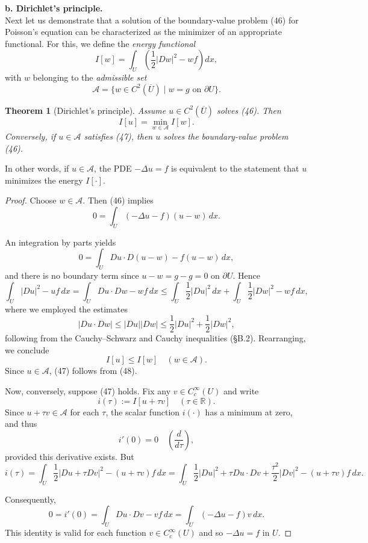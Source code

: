 \documentclass[a4paper,12pt]{report}
\newtheorem{theorem}{Theorem}[section]
\begin{document}
\noindent
\textbf{b. Dirichlet's principle.}\\

Next let us demonstrate that a solution of the boundary-value problem (46) for Poisson's equation can be characterized as the minimizer of an appropriate functional. For this, we define the \emph{energy functional}
\[
I[w] = \int_U \left( \frac{1}{2} |Dw|^2 - w f \right) dx,
\]
with \( w \) belonging to the \emph{admissible set}
\[
\mathcal{A} = \{ w \in C^2(\overline{U}) \mid w = g \text{ on } \partial U \}.
\]
\begin{theorem}[Dirichlet's principle]
Assume \( u \in C^2(\overline{U}) \) solves (46). Then
\[
I[u] = \min_{w \in \mathcal{A}} I[w].
\tag{47}
\]
Conversely, if \( u \in \mathcal{A} \) satisfies (47), then \( u \) solves the boundary-value problem (46).
\end{theorem}
In other words, if \( u \in \mathcal{A} \), the PDE \( -\Delta u = f \) is equivalent to the statement that \( u \) minimizes the energy \( I[\cdot] \).
\begin{proof}
Choose \( w \in \mathcal{A} \). Then (46) implies
\[
0 = \int_U (-\Delta u - f)(u - w) \, dx.
\]

An integration by parts yields
\[
0 = \int_U Du \cdot D(u - w) - f(u - w) \, dx,
\]
and there is no boundary term since \( u - w = g - g = 0 \) on \( \partial U \). Hence
\[
\int_U |Du|^2 - uf \, dx = \int_U Du \cdot Dw - wf \, dx \leq \int_U \frac{1}{2} |Du|^2 \, dx + \int_U \frac{1}{2} |Dw|^2 - wf \, dx,
\]
where we employed the estimates
\[
|Du \cdot Dw| \leq |Du||Dw| \leq \frac{1}{2}|Du|^2 + \frac{1}{2}|Dw|^2,
\]
following from the Cauchy–Schwarz and Cauchy inequalities (\S B.2). Rearranging, we conclude
\[
I[u] \leq I[w] \quad (w \in \mathcal{A}).
\]
Since \( u \in \mathcal{A} \), (47) follows from (48).

Now, conversely, suppose (47) holds. Fix any \( v \in C_c^\infty(U) \) and write
\[
i(\tau) := I[u + \tau v] \quad (\tau \in \mathbb{R}).
\]
Since \( u + \tau v \in \mathcal{A} \) for each \( \tau \), the scalar function \( i(\cdot) \) has a minimum at zero, and thus
\[
i'(0) = 0 \quad \left(\frac{d}{d\tau}\right),
\]
provided this derivative exists. But
\[
i(\tau) = \int_U \frac{1}{2}|Du + \tau Dv|^2 - (u + \tau v)f \, dx = \int_U \frac{1}{2}|Du|^2 + \tau Du \cdot Dv + \frac{\tau^2}{2}|Dv|^2 - (u + \tau v)f \, dx.
\]

Consequently,
\[
0 = i'(0) = \int_U Du \cdot Dv - vf \, dx = \int_U (-\Delta u - f)v \, dx.
\]
This identity is valid for each function \( v \in C_c^\infty(U) \) and so \( -\Delta u = f \) in \( U \).
\end{proof}
\end{document}
